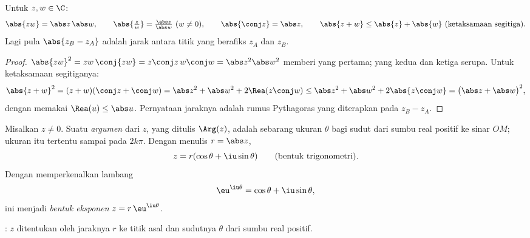 \begin{proposition}\label{prop:g12:complex:modulus}
Untuk $z, w \in \C$:
\[
\abs{zw} = \abs z\,\abs w, \qquad
\abs{\tfrac zw} = \tfrac{\abs z}{\abs w}\ (w \neq 0), \qquad
\abs{\conj z} = \abs z, \qquad
\abs{z + w} \leq \abs{z} + \abs{w} \ \text{(ketaksamaan segitiga)}.
\]
Lagi pula $\abs{z_B - z_A}$ adalah jarak antara titik yang berafiks
$z_A$ dan $z_B$.
\end{proposition}

\begin{proof}
$\abs{zw}^2 = zw\,\conj{zw} = z\conj z\, w \conj w = \abs z^2 \abs w^2$
memberi yang pertama; yang kedua dan ketiga serupa. Untuk ketaksamaan
segitiganya:
\[
\abs{z+w}^2 = (z+w)(\conj z + \conj w)
= \abs z^2 + \abs w^2 + 2\Rea(z \conj w)
\leq \abs z^2 + \abs w^2 + 2\abs{z\conj w}
= \bigl(\abs z + \abs w\bigr)^2,
\]
dengan memakai $\Rea(u) \leq \abs u$. Pernyataan jaraknya adalah rumus
Pythagoras yang diterapkan pada  $z_B - z_A$.
\end{proof}

\begin{definition}\label{def:g12:complex:argument}
Misalkan $z \neq 0$. Suatu \emph{argumen} dari $z$, yang ditulis
$\Arg(z)$, adalah sebarang ukuran $\theta$ bagi sudut dari sumbu real positif
ke sinar $OM$; ukuran itu tertentu sampai pada $2k\pi$. Dengan menulis $r = \abs z$,
\[
z = r(\cos\theta + \iu\sin\theta)
\qquad\text{(bentuk trigonometri)}.
\]
Dengan memperkenalkan lambang
\[
\eu^{\iu\theta} = \cos\theta + \iu\sin\theta,
\]
ini menjadi \emph{bentuk eksponen} $z = r\,\eu^{\iu\theta}$.
\end{definition}

\begin{omfigure}

{\small {}: $z$ ditentukan oleh jaraknya $r$ ke
titik asal dan sudutnya $\theta$ dari sumbu real positif.}
\end{omfigure}

